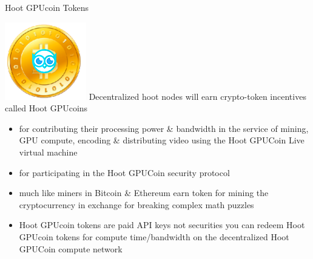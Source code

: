 
\begin{frame}[t]{ Hoot GPUcoin Tokens }
 
 
\includegraphics[scale=0.2]{static/hootcoin} Decentralized hoot nodes will earn crypto-token incentives called Hoot GPUcoins 
 

 \begin{itemize}[<+-| alert@+>]
 \item for contributing their processing power \& bandwidth in the service of mining, GPU compute, encoding \& distributing video using the Hoot GPUCoin Live virtual machine 
 \item for participating in the Hoot GPUCoin security protocol
 \item much like miners in Bitcoin \& Ethereum earn token for mining the cryptocurrency in exchange for breaking complex math puzzles
 \item Hoot GPUcoin tokens are paid API keys not securities you can redeem Hoot GPUcoin tokens for compute time/bandwidth on the decentralized Hoot GPUCoin compute network
 \end{itemize}
 
 
 
\end{frame}